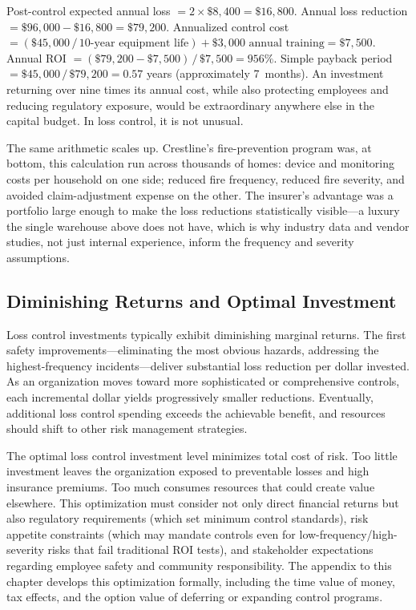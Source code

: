\documentclass[11pt,openany]{book}
\begin{document}
Post-control expected annual loss \(= 2 \times \$8{,}400 = \$16{,}800\).
Annual loss reduction \(= \$96{,}000 - \$16{,}800 = \$79{,}200\). Annualized
control cost \(= (\$45{,}000\,/\,\text{10-year equipment life}) + \$3{,}000
\text{ annual training} = \$7{,}500\). Annual ROI
\(= (\$79{,}200 - \$7{,}500)\,/\,\$7{,}500 = 956\%\). Simple payback period
\(= \$45{,}000\,/\,\$79{,}200 = 0.57\) years (approximately 7~months). An
investment returning over nine times its annual cost, while also protecting
employees and reducing regulatory exposure, would be extraordinary anywhere
else in the capital budget. In loss control, it is not unusual.

The same arithmetic scales up. Crestline's fire-prevention program was, at
bottom, this calculation run across thousands of homes: device and monitoring
costs per household on one side; reduced fire frequency, reduced fire
severity, and avoided claim-adjustment expense on the other. The insurer's
advantage was a portfolio large enough to make the loss reductions
statistically visible---a luxury the single warehouse above does not have,
which is why industry data and vendor studies, not just internal experience,
inform the frequency and severity assumptions.

\subsection{Diminishing Returns and Optimal Investment}

Loss control investments typically exhibit diminishing marginal returns. The
first safety improvements---eliminating the most obvious hazards, addressing
the highest-frequency incidents---deliver substantial loss reduction per
dollar invested. As an organization moves toward more sophisticated or
comprehensive controls, each incremental dollar yields progressively smaller
reductions. Eventually, additional loss control spending exceeds the
achievable benefit, and resources should shift to other risk management
strategies.

The optimal loss control investment level minimizes total cost of risk. Too
little investment leaves the organization exposed to preventable losses and
high insurance premiums. Too much consumes resources that could create value
elsewhere. This optimization must consider not only direct financial returns
but also regulatory requirements (which set minimum control standards), risk
appetite constraints (which may mandate controls even for
low-frequency/high-severity risks that fail traditional ROI tests), and
stakeholder expectations regarding employee safety and community
responsibility. The appendix to this chapter develops this optimization
formally, including the time value of money, tax effects, and the option value
of deferring or expanding control programs.
\end{document}

